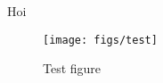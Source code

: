 \documentclass{article}
\begin{document}
Hoi

\begin{figure}
    \centering\texttt{[image: figs/test]}
    \caption{Test figure}
    \label{fig:figs_test}
\end{figure}
\end{document}
